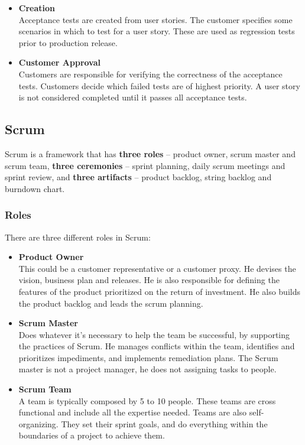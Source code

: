 \documentclass{article}
\begin{document}
\begin{itemize}
	\item \textbf{Creation}
	\vspace{.2cm} \\
	Acceptance tests are created from user stories. The customer specifies some scenarios in which to test for a user story. These are used as regression tests prior to production release.
	
	\item \textbf{Customer Approval}
	\vspace{.2cm} \\
	Customers are responsible for verifying the correctness of the acceptance tests. Customers decide which failed tests are of highest priority. A user story is not considered completed until it passes all acceptance tests.
\end{itemize}

\subsection{Scrum}
Scrum is a framework that has \textbf{three roles} -- product owner, scrum master and scrum team, \textbf{three ceremonies} -- sprint planning, daily scrum meetings and sprint review, and \textbf{three artifacts} -- product backlog, string backlog and burndown chart.

\subsubsection{Roles}
There are three different roles in Scrum:

\begin{itemize}
	\item \textbf{Product Owner}
	\vspace{.2cm} \\
	This could be a customer representative or a customer proxy. He devises the vision, business plan and releases. He is also responsible for defining the features of the product prioritized on the return of investment. He also builds the product backlog and leads the scrum planning.
	
	\item \textbf{Scrum Master}
	\vspace{.2cm} \\
	Does whatever it's necessary to help the team be successful, by supporting the practices of Scrum. He manages conflicts within the team, identifies and prioritizes impediments, and implements remediation plans. The Scrum master is not a project manager, he does not assigning tasks to people.
	
	\item \textbf{Scrum Team}
	\vspace{.2cm} \\
	A team is typically composed by 5 to 10 people. These teams are cross functional and include all the expertise needed. Teams are also self-organizing. They set their sprint goals, and do everything within the boundaries of a project to achieve them.
\end{itemize}
\end{document}
